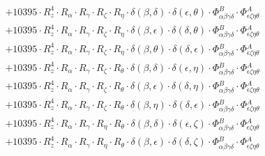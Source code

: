 \documentclass{article}
\begin{document}
\begin{equation}
\begin{array}{c}
 \\[0.2em] 		 + 10395 \cdot R_{z}^{4} \cdot R_{\alpha{}} \cdot R_{\gamma{}} \cdot R_{\zeta{}} \cdot R_{\eta{}} \cdot \delta{}\left(\beta{}, \delta{}\right) \cdot \delta{}\left(\epsilon{}, \theta{}\right) \cdot \Phi{}^{B}_{\alpha{}\beta{}\gamma{}\delta{}} \cdot \Phi{}^{A}_{\epsilon{}\zeta{}\eta{}\theta{}} 
 \\[0.2em] 		 + 10395 \cdot R_{z}^{4} \cdot R_{\alpha{}} \cdot R_{\gamma{}} \cdot R_{\zeta{}} \cdot R_{\eta{}} \cdot \delta{}\left(\beta{}, \epsilon{}\right) \cdot \delta{}\left(\delta{}, \theta{}\right) \cdot \Phi{}^{B}_{\alpha{}\beta{}\gamma{}\delta{}} \cdot \Phi{}^{A}_{\epsilon{}\zeta{}\eta{}\theta{}} 
 \\[0.2em] 		 + 10395 \cdot R_{z}^{4} \cdot R_{\alpha{}} \cdot R_{\gamma{}} \cdot R_{\zeta{}} \cdot R_{\eta{}} \cdot \delta{}\left(\beta{}, \theta{}\right) \cdot \delta{}\left(\delta{}, \epsilon{}\right) \cdot \Phi{}^{B}_{\alpha{}\beta{}\gamma{}\delta{}} \cdot \Phi{}^{A}_{\epsilon{}\zeta{}\eta{}\theta{}} 
 \\[0.2em] 		 + 10395 \cdot R_{z}^{4} \cdot R_{\alpha{}} \cdot R_{\gamma{}} \cdot R_{\zeta{}} \cdot R_{\theta{}} \cdot \delta{}\left(\beta{}, \delta{}\right) \cdot \delta{}\left(\epsilon{}, \eta{}\right) \cdot \Phi{}^{B}_{\alpha{}\beta{}\gamma{}\delta{}} \cdot \Phi{}^{A}_{\epsilon{}\zeta{}\eta{}\theta{}} 
 \\[0.2em] 		 + 10395 \cdot R_{z}^{4} \cdot R_{\alpha{}} \cdot R_{\gamma{}} \cdot R_{\zeta{}} \cdot R_{\theta{}} \cdot \delta{}\left(\beta{}, \epsilon{}\right) \cdot \delta{}\left(\delta{}, \eta{}\right) \cdot \Phi{}^{B}_{\alpha{}\beta{}\gamma{}\delta{}} \cdot \Phi{}^{A}_{\epsilon{}\zeta{}\eta{}\theta{}} 
 \\[0.2em] 		 + 10395 \cdot R_{z}^{4} \cdot R_{\alpha{}} \cdot R_{\gamma{}} \cdot R_{\zeta{}} \cdot R_{\theta{}} \cdot \delta{}\left(\beta{}, \eta{}\right) \cdot \delta{}\left(\delta{}, \epsilon{}\right) \cdot \Phi{}^{B}_{\alpha{}\beta{}\gamma{}\delta{}} \cdot \Phi{}^{A}_{\epsilon{}\zeta{}\eta{}\theta{}} 
 \\[0.2em] 		 + 10395 \cdot R_{z}^{4} \cdot R_{\alpha{}} \cdot R_{\gamma{}} \cdot R_{\eta{}} \cdot R_{\theta{}} \cdot \delta{}\left(\beta{}, \delta{}\right) \cdot \delta{}\left(\epsilon{}, \zeta{}\right) \cdot \Phi{}^{B}_{\alpha{}\beta{}\gamma{}\delta{}} \cdot \Phi{}^{A}_{\epsilon{}\zeta{}\eta{}\theta{}} 
 \\[0.2em] 		 + 10395 \cdot R_{z}^{4} \cdot R_{\alpha{}} \cdot R_{\gamma{}} \cdot R_{\eta{}} \cdot R_{\theta{}} \cdot \delta{}\left(\beta{}, \epsilon{}\right) \cdot \delta{}\left(\delta{}, \zeta{}\right) \cdot \Phi{}^{B}_{\alpha{}\beta{}\gamma{}\delta{}} \cdot \Phi{}^{A}_{\epsilon{}\zeta{}\eta{}\theta{}} 

\end{array}
\end{equation}
\end{document}
